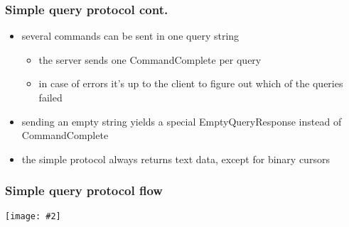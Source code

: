 \documentclass{beamer}
\newcommand{\mscdiagram}[2][1]{
  \begin{center}
    \texttt{[image: \#2]}
  \end{center}
}
\begin{document}
\begin{frame}
  \frametitle{Simple query protocol cont.}

  \begin{itemize}
  \item several commands can be sent in one query string
    \begin{itemize}
    \item the server sends one CommandComplete per query
    \item in case of errors it's up to the client to figure out which of the
      queries failed
    \end{itemize}
  \item sending an empty string yields a special EmptyQueryResponse instead of
    CommandComplete
  \item the simple protocol always returns text data, except for binary cursors
  \end{itemize}
\end{frame}

\begin{frame}
  \frametitle{Simple query protocol flow}

  \mscdiagram{simple-query-protocol}
\end{frame}
\end{document}
